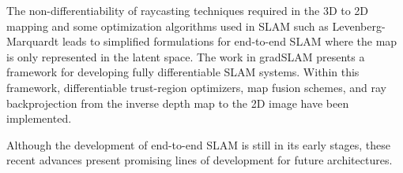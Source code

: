 The non-differentiability of raycasting techniques required in the 3D to 2D mapping and some optimization algorithms used in SLAM such as Levenberg-Marquardt leads to simplified formulations for end-to-end SLAM where the map is only represented in the latent space. The work in gradSLAM \cite{jatavallabhula2020gradslam} presents a framework for developing fully differentiable SLAM systems. Within this framework, differentiable trust-region optimizers, map fusion schemes, and ray backprojection from the inverse depth map to the 2D image have been implemented. 

Although the development of end-to-end SLAM is still in its early stages, these recent advances present promising lines of development for future architectures. 